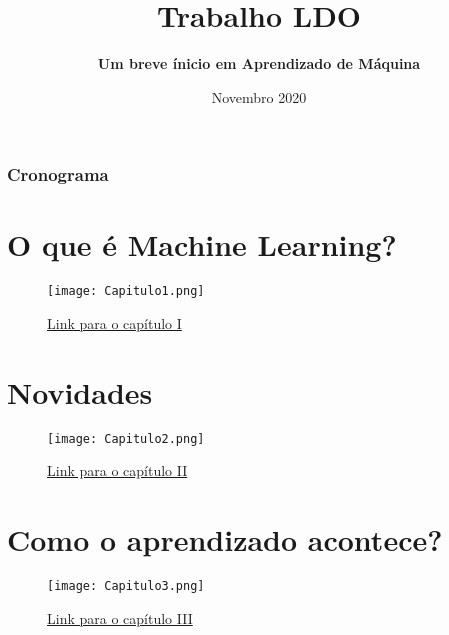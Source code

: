 \documentclass{beamer}
\title[LDO] %
{\textbf{Trabalho LDO}}
\subtitle{\textbf{Um breve ínicio em Aprendizado de Máquina}}
\institute[PUC] %
{
  \inst{1}%
  \emph{Pontifícia Universidade Católica de Minas Gerais}
  \\PUC-MG
}
\date[2020] %
{Novembro 2020}
\begin{document}
\frame{\titlepage}


\begin{frame}
    \frametitle{Cronograma}
    \tableofcontents
\end{frame}

\section{O que é Machine Learning?}

\begin{frame}

    \begin{figure}[ht]
        \centering
        \texttt{[image: Capitulo1.png]}
        \caption{\href{run:./capitulos/Capitulo_01/Capitulo1.pdf}{Link para o capítulo I}}
    \end{figure}

\end{frame}

\section{Novidades}

\begin{frame}

    \begin{figure}[ht]
        \centering
        \texttt{[image: Capitulo2.png]}
        \caption{\href{run:./capitulos/Capitulo_02/Capitulo2.pdf}{Link para o capítulo II}}
    \end{figure}

\end{frame}

\section{Como o aprendizado acontece?}

\begin{frame}

    \begin{figure}[ht]
        \centering
        \texttt{[image: Capitulo3.png]}
        \caption{\href{run:./capitulos/Capitulo_03/Capitulo03.pdf}{Link para o capítulo III}}
    \end{figure}

\end{frame}
\end{document}
